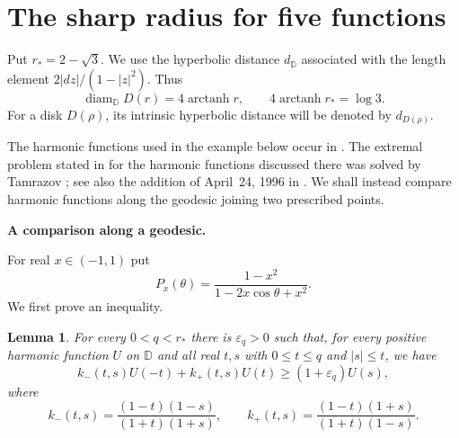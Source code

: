 \documentclass[12pt,letterpaper,reqno]{amsart}
\newtheorem{lem}[thm]{Lemma}
\theoremstyle{definition}
\numberwithin{equation}{section}
\newcommand{\D}{\mathbb D}
\begin{document}
	
	\section{The sharp radius for five functions}\label{sec:sharp-five}
	
	Put $r_*=2-\sqrt3$. We use the hyperbolic distance $d_{\D}$ associated
	with the length element $2|dz|/(1-|z|^2)$. Thus
	\begin{equation}\label{eq:five-hyperbolic-radius}
		\operatorname{diam}_{\D}D(r)=4\operatorname{arctanh}r,
		\qquad 4\operatorname{arctanh}r_*=\log3.
	\end{equation}
	For a disk $D(\rho)$, its intrinsic hyperbolic distance will be denoted by
	$d_{D(\rho)}$.
	
	The harmonic functions used in the example below occur in
	\cite{Ere96b}. The extremal problem stated in \cite{Ere96b} for the
	harmonic functions discussed there was solved by Tamrazov
	\cite{Tam98}; see also the addition of April~24, 1996 in
	\cite{Ere96b}. We shall instead compare harmonic functions
	along the geodesic joining two prescribed points.
	
	\medskip\noindent\textbf{A comparison along a geodesic.}
	
	For real $x\in(-1,1)$ put
	\[
	P_x(\theta)=\frac{1-x^2}{1-2x\cos\theta+x^2}.
	\]
	We first prove an inequality.
	
\begin{lem}\label{lem:two-point-kernel}
    For every $0<q<r_*$ there is $\varepsilon_q>0$ such that,
    for every positive harmonic function $U$ on $\D$ and all real
    $t,s$ with $0\le t\le q$ and $|s|\le t$, we have
    \begin{equation}\label{eq:two-point-kernel}
        k_-(t,s)U(-t)+k_+(t,s)U(t)
        \ge(1+\varepsilon_q)U(s),
    \end{equation}
    where
    \[
        k_-(t,s)=\frac{(1-t)(1-s)}{(1+t)(1+s)},\qquad
        k_+(t,s)=\frac{(1-t)(1+s)}{(1+t)(1-s)}.
    \]
\end{lem}
	
\end{document}
